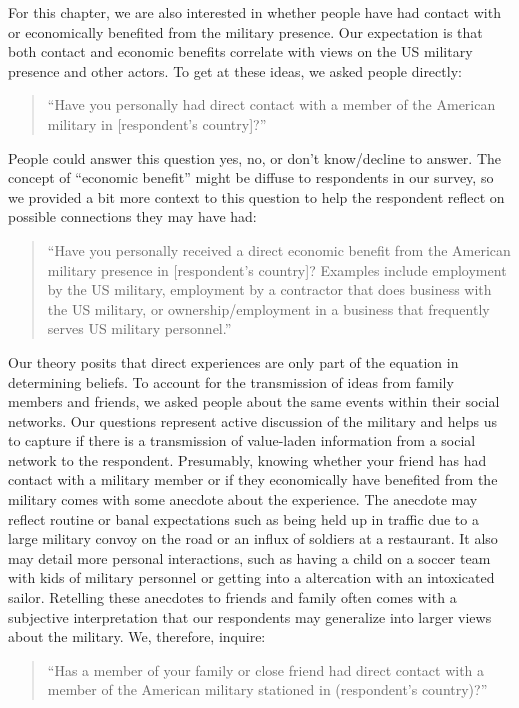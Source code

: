 For this chapter, we are also interested in whether people have had contact with or economically benefited from the military presence. Our expectation is that both contact and economic benefits correlate with views on the US military presence and other actors. To get at these ideas, we asked people directly:

	\begin{quote}
		``Have you personally had direct contact with a member of the American military in [respondent's country]?''
	\end{quote}

People could answer this question yes, no, or don't know/decline to answer. The concept of ``economic benefit'' might be diffuse to respondents in our survey, so we provided a bit more context to this question to help the respondent reflect on possible connections they may have had:

	\begin{quote}
		``Have you personally received a direct economic benefit from the American military presence in [respondent's country]? Examples include employment by the US military, employment by a contractor that does business with the US military, or ownership/employment in a business that frequently serves US military personnel.''
	\end{quote}

Our theory posits that direct experiences are only part of the equation in determining beliefs. To account for the transmission of ideas from family members and friends, we asked people about the same events within their social networks. Our questions represent active discussion of the military and helps us to capture if there is a transmission of value-laden information from a social network to the respondent. Presumably, knowing whether your friend has had contact with a military member or if they economically have benefited from the military comes with some anecdote about the experience. The anecdote may reflect routine or banal expectations such as being held up in traffic due to a large military convoy on the road or an influx of soldiers at a restaurant. It also may detail more personal interactions, such as having a child on a soccer team with kids of military personnel or getting into a altercation with an intoxicated sailor. Retelling these anecdotes to friends and family often comes with a subjective interpretation that our respondents may generalize into larger views about the military. We, therefore, inquire:
	
	\begin{quote}
		``Has a member of your family or close friend had direct contact with a member of the American military stationed in (respondent's country)?''
	\end{quote}

